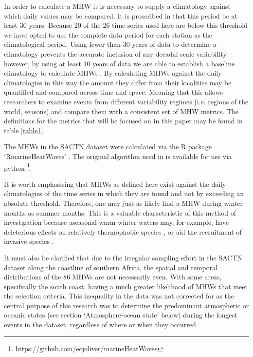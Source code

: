 \documentclass[utf8]{frontiersSCNS}
\begin{document}
In order to calculate a MHW it is necessary to supply a climatology against which daily values may be compared. It is proscribed in \citet{Hobday2016} that this period be at least 30 years. Because 20 of the 26 time series used here are below this threshold we have opted to use the complete data period for each station as the climatological period. Using fewer than 30 years of data to determine a climatology prevents the accurate inclusion of any decadal scale variability \citep{Schlegel2016} however, by using at least 10 years of data we are able to establish a baseline climatology to calculate MHWs \citep{Schlegel2017}. By calculating MHWs against the daily climatologies in this way the amount they differ from their localities may be quantified and compared across time and space. Meaning that this allows researchers to examine events from different variability regimes (i.e. regions of the world, seasons) and compare them with a consistent set of MHW metrics. The definitions for the metrics that will be focused on in this paper may be found in table \ref{table1}.




The MHWs in the SACTN dataset were calculated via the R package `RmarineHeatWaves' \citep{Smit2017}. The original algorithm used in \citet{Hobday2016} is available for use via python \footnote{https://github.com/ecjoliver/marineHeatWaves}.

It is worth emphasising that MHWs as defined here exist against the daily climatologies of the time series in which they are found and not by exceeding an absolute threshold. Therefore, one may just as likely find a MHW during winter months as summer months. This is a valuable characteristic of this method of investigation because aseasonal warm winter waters may, for example, have deleterious effects on relatively thermophobic species \citep{Wernberg2011}, or aid the recruitment of invasive species \citep{Stachowicz2002}.

It must also be clarified that due to the irregular sampling effort in the SACTN dataset along the coastline of southern Africa, the spatial and temporal distributions of the 86 MHWs are not necessarily even. With some areas, specifically the south coast, having a much greater likelihood of MHWs that meet the selection criteria. This inequality in the data was not corrected for as the central purpose of this research was to determine the predominant atmospheric or oceanic states (see section `Atmosphere-ocean state' below) during the longest events in the dataset, regardless of where or when they occurred.
\end{document}
